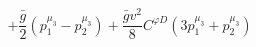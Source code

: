%
\begin{dmath*}
%
  +  \frac{{\bar g}{}}{2} \left(p_1^{\mu_3} - p_2^{\mu_3}\right)  +  \frac{{\bar g}{} v^2}{8}C^{ \varphi  D} \left(3 p_1^{\mu_3} + p_2^{\mu_3}\right)
%
\end{dmath*}
%
